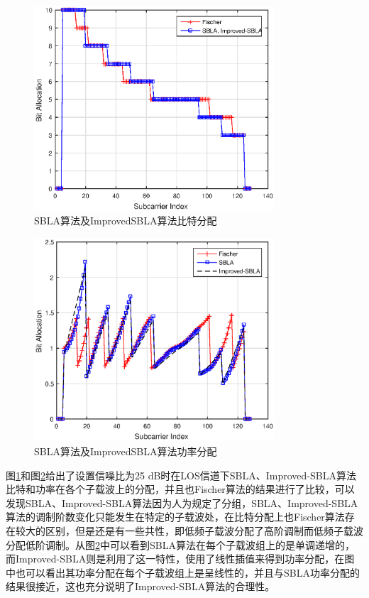 \begin{figure}[htbp]
\centering
\includegraphics[width=0.8\textwidth]{figures/chapter-4/SBLAloadedBit.eps}
\caption{SBLA算法及ImprovedSBLA算法比特分配}
\label{fig:SBLAloadedBit}
\end{figure}

\begin{figure}[htbp]
\centering
\includegraphics[width=0.8\textwidth]{figures/chapter-4/SBLAloadedPower.eps}
\caption{SBLA算法及ImprovedSBLA算法功率分配}
\label{fig:SBLAloadedPower}
\end{figure}
图\ref{fig:SBLAloadedBit}和图\ref{fig:SBLAloadedPower}给出了设置信噪比为25 dB时在LOS信道下SBLA、Improved-SBLA算法比特和功率在各个子载波上的分配，并且也Fischer算法的结果进行了比较，可以发现SBLA、Improved-SBLA算法因为人为规定了分组，SBLA、Improved-SBLA算法的调制阶数变化只能发生在特定的子载波处，在比特分配上也Fischer算法存在较大的区别，但是还是有一些共性，即低频子载波分配了高阶调制而低频子载波分配低阶调制。从图\ref{fig:SBLAloadedPower}中可以看到SBLA算法在每个子载波组上的是单调递增的，而Improved-SBLA则是利用了这一特性，使用了线性插值来得到功率分配，在图中也可以看出其功率分配在每个子载波组上是呈线性的，并且与SBLA功率分配的结果很接近，这也充分说明了Improved-SBLA算法的合理性。

